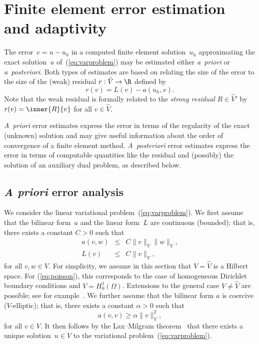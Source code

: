 \section{Finite element error estimation and adaptivity}

The error~$e = u - u_h$ in a computed finite element solution~$u_h$
approximating the exact solution~$u$ of~(\ref{eq:varproblem}) may be
estimated either \emph{a~priori} or \emph{a~posteriori}. Both types of
estimates are based on relating the size of the error to the size of
the (weak) residual $r : \hat{V} \rightarrow \R$ defined by
\begin{equation} \label{eq:residual,weak}
  r(v) = L(v) - a(u_h, v).
\end{equation}
Note that the weak residual is formally related to the \emph{strong
  residual} $R \in \hat{V}'$ by $r(v) = \inner{R}{v}$ for all $v \in
\hat{V}$.

\emph{A~priori} error estimates express the error in terms of the
regularity of the exact (unknown) solution and may give useful
information about the order of convergence of a finite element
method. \emph{A~posteriori} error estimates express the error in terms
of computable quantities like the residual and (possibly) the solution
of an auxiliary dual problem, as described below.

\subsection{\emph{A priori} error analysis}

We consider the linear variational problem~(\ref{eq:varproblem}). We
first assume that the bilinear form~$a$ and the linear form~$L$ are
continuous (bounded); that is, there exists a constant $C > 0$ such
that
\begin{eqnarray} \label{eq:continuity}
  a(v, w) &\leq& C \|v\|_V \|w\|_V, \\
  L(v) &\leq& C \|v\|_V,
\end{eqnarray}
for all $v, w \in V$. For simplicity, we assume in this section that
$V = \hat{V}$ is a Hilbert space. For (\ref{eq:poisson}), this
corresponds to the case of homogeneous Dirichlet boundary conditions
and $V = H^1_0(\Omega)$. Extensions to the general case $V \neq
\hat{V}$ are possible; see for example~\citet{OdenDemkowicz1996}. We
further assume that the bilinear form $a$ is coercive ($V$-elliptic);
that is, there exists a constant $\alpha > 0$ such that
\begin{equation} \label{eq:coercivity}
  a(v, v) \geqslant \alpha \|v\|_V^2,
\end{equation}
for all $v \in V$. It then follows by the Lax--Milgram
theorem~\citep{LaxMilgram1954} that there exists a unique solution~$u
\in V$ to the variational problem~(\ref{eq:varproblem}).

